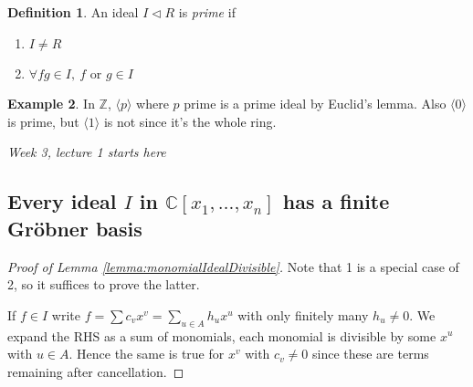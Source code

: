 \documentclass[a4paper]{article}
\newcommand{\la}{\langle}
\newcommand{\ra}{\rangle}
\newcommand{\Z}{\mathbb Z}
\newcommand{\C}{\mathbb C}
\theoremstyle{definition}
\newtheorem{defn}{Definition}[subsection]
\newtheorem{example}[defn]{Example}
\begin{document}
\begin{defn}
An ideal $I\lhd R$ is \textit{prime} if
\begin{enumerate}
\item $I\neq R$
\item $\forall fg\in I,\ f$ or $g\in I$
\end{enumerate}
\end{defn}
\begin{example}
In $\Z$, $\la p\ra$ where $p$ prime is a prime ideal by Euclid's lemma. Also $\la 0\ra$ is prime, but $\la 1\ra$ is not since it's the whole ring.
\end{example}

\begin{flushright}
\textit{Week 3, lecture 1 starts here}
\end{flushright}

\subsection{Every ideal $I$ in $\C[x_1,\ldots,x_n]$ has a finite Gröbner basis}

\begin{proof}[Proof of Lemma \ref{lemma:monomialIdealDivisible}]
Note that 1 is a special case of 2, so it suffices to prove the latter.

If $f\in I$ write $f=\sum c_v x^v = \sum_{u\in A} h_u x^u$ with only finitely many $h_u\neq 0$. We expand the RHS as a sum of monomials, each monomial is divisible by some $x^u$ with $u\in A$. Hence the same is true for $x^v$ with $c_v\neq 0$ since these are terms remaining after cancellation.
\end{proof}
\end{document}
